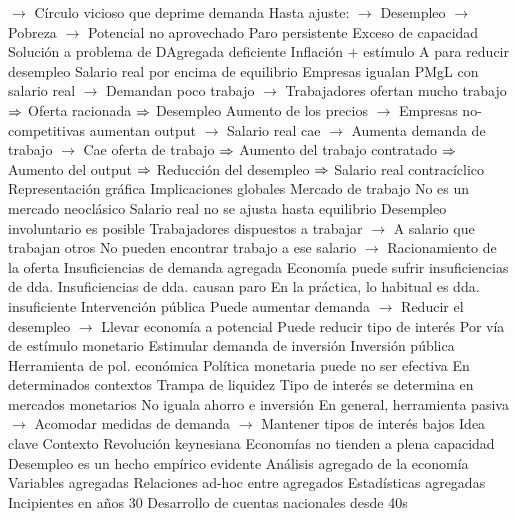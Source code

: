 \documentclass{nuevotema}
\begin{document}
\begin{esquemal}
				\4[] $\to$ Círculo vicioso que deprime demanda
				\4 Hasta ajuste:
				\4[] $\to$ Desempleo
				\4[] $\to$ Pobreza
				\4[] $\to$ Potencial no aprovechado
				\4[$\then$] Paro persistente
				\4[$\then$] Exceso de capacidad
				\4 Solución a problema de DAgregada deficiente
				\4[] Inflación + estímulo A para reducir desempleo
				\4[] Salario real por encima de equilibrio
				\4[] Empresas igualan PMgL con salario real
				\4[] $\to$ Demandan poco trabajo
				\4[] $\to$ Trabajadores ofertan mucho trabajo
				\4[] $\then$ Oferta racionada
				\4[] $\then$ Desempleo
				\4[] Aumento de los precios
				\4[] $\to$ Empresas no-competitivas aumentan output
				\4[] $\to$ Salario real cae
				\4[] $\to$ Aumenta demanda de trabajo
				\4[] $\to$ Cae oferta de trabajo
				\4[] $\then$ Aumento del trabajo contratado
				\4[] $\then$ Aumento del output
				\4[] $\then$ Reducción del desempleo
				\4[] $\then$ Salario real contracíclico
				\4 Representación gráfica
				\4[] 
		\2 Implicaciones globales
			\3 Mercado de trabajo
				\4 No es un mercado neoclásico
				\4 Salario real no se ajusta hasta equilibrio
				\4 Desempleo involuntario es posible
				\4[] Trabajadores dispuestos a trabajar
				\4[] $\to$ A salario que trabajan otros
				\4[] No pueden encontrar trabajo a ese salario
				\4[] $\to$ Racionamiento de la oferta
			\3 Insuficiencias de demanda agregada
				\4 Economía puede sufrir insuficiencias de dda.
				\4 Insuficiencias de dda. causan paro
				\4[$\to$] En la práctica, lo habitual es dda. insuficiente
			\3 Intervención pública
				\4 Puede aumentar demanda
				\4[] $\to$ Reducir el desempleo
				\4[] $\to$ Llevar economía a potencial
				\4 Puede reducir tipo de interés
				\4[] Por vía de estímulo monetario
				\4[] Estimular demanda de inversión
				\4 Inversión pública
				\4[] Herramienta de pol. económica
			\3 Política monetaria puede no ser efectiva
				\4 En determinados contextos
				\4[] Trampa de liquidez
				\4 Tipo de interés se determina en mercados monetarios
				\4[] No iguala ahorro e inversión
				\4 En general, herramienta pasiva
				\4[] $\to$ Acomodar medidas de demanda
				\4[] $\to$ Mantener tipos de interés bajos
	\1 
		\2 Idea clave
			\3 Contexto
				\4 Revolución keynesiana
				\4[] Economías no tienden a plena capacidad
				\4[] Desempleo es un hecho empírico evidente
				\4 Análisis agregado de la economía
				\4[] Variables agregadas
				\4[] Relaciones ad-hoc entre agregados
				\4 Estadísticas agregadas
				\4[] Incipientes en años 30
				\4[] Desarrollo de cuentas nacionales desde 40s

\end{esquemal}
\end{document}
